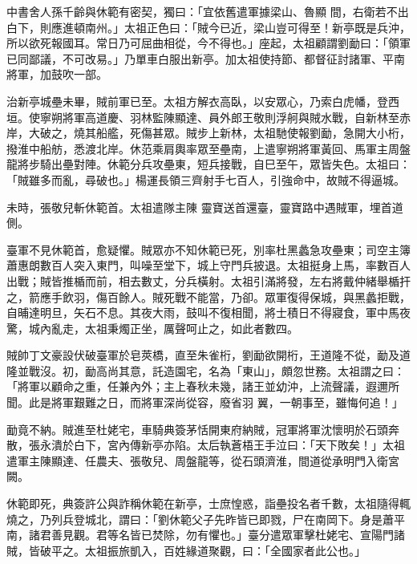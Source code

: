 \begin{pinyinscope}
 中書舍人孫千齡與休範有密契，獨曰：「宜依舊遣軍據梁山、魯顯
 間，右衛若不出白下，則應進頓南州。」太祖正色曰：「賊今已近，梁山豈可得至！新亭既是兵沖，所以欲死報國耳。常日乃可屈曲相從，今不得也。」座起，太祖顧謂劉勔曰：「領軍已同鄙議，不可改易。」乃單車白服出新亭。加太祖使持節、都督征討諸軍、平南將軍，加鼓吹一部。



 治新亭城壘未畢，賊前軍已至。太祖方解衣高臥，以安眾心，乃索白虎幡，登西垣。使寧朔將軍高道慶、羽林監陳顯達、員外郎王敬則浮舸與賊水戰，自新林至赤岸，大破之，燒其船艦，死傷甚眾。賊步上新林，太祖馳使報劉勔，急開大小桁，撥淮中船舫，悉渡北岸。休范乘肩輿率眾至壘南，上遣寧朔將軍黃回、馬軍主周盤龍將步騎出壘對陣。休範分兵攻壘東，短兵接戰，自巳至午，眾皆失色。太祖曰：「賊雖多而亂，尋破也。」楊運長領三齊射手七百人，引強命中，故賊不得逼城。



 未時，張敬兒斬休範首。太祖遣隊主陳
 靈寶送首還臺，靈寶路中遇賊軍，埋首道側。



 臺軍不見休範首，愈疑懼。賊眾亦不知休範已死，別率杜黑蠡急攻壘東；司空主簿蕭惠朗數百人突入東門，叫噪至堂下，城上守門兵披退。太祖挺身上馬，率數百人出戰；賊皆推楯而前，相去數丈，分兵橫射。太祖引滿將發，左右將戴仲緒舉楯扞之，箭應手飲羽，傷百餘人。賊死戰不能當，乃卻。眾軍復得保城，與黑蠡拒戰，自晡達明旦，矢石不息。其夜大雨，鼓叫不復相聞，將士積日不得寢食，軍中馬夜驚，城內亂走，太祖秉燭正坐，厲聲呵止之，如此者數四。



 賊帥丁文豪設伏破臺軍於皂莢橋，直至朱雀桁，劉勔欲開桁，王道隆不從，勔及道隆並戰沒。初，勔高尚其意，託造園宅，名為「東山」，頗忽世務。太祖謂之曰：「將軍以顧命之重，任兼內外；主上春秋未幾，諸王並幼沖，上流聲議，遐邇所聞。此是將軍艱難之日，而將軍深尚從容，廢省羽
 翼，一朝事至，雖悔何追！」



 勔竟不納。賊進至杜姥宅，車騎典簽茅恬開東府納賊，冠軍將軍沈懷明於石頭奔散，張永潰於白下，宮內傳新亭亦陷。太后執蒼梧王手泣曰：「天下敗矣！」太祖遣軍主陳顯達、任農夫、張敬兒、周盤龍等，從石頭濟淮，間道從承明門入衛宮闕。



 休範即死，典簽許公與詐稱休範在新亭，士庶惶惑，詣壘投名者千數，太祖隨得輒燒之，乃列兵登城北，謂曰：「劉休範父子先昨皆已即戮，尸在南岡下。身是蕭平南，諸君善見觀。君等名皆已焚除，勿有懼也。」臺分遣眾軍擊杜姥宅、宣陽門諸賊，皆破平之。太祖振旅凱入，百姓緣道聚觀，曰：「全國家者此公也。」




\end{pinyinscope}
